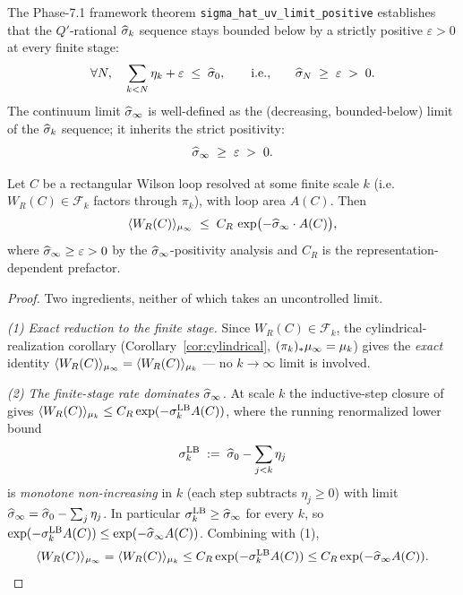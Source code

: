 The Phase-7.1 framework theorem
\texttt{sigma\_hat\_uv\_limit\_positive} establishes that the
$Q'$-rational $\widehat{\sigma}_k$ sequence stays bounded below by a strictly
positive $\varepsilon > 0$ at every finite stage:
\begin{equation*}
  \forall N, \quad \sum_{k < N} \eta_k + \varepsilon \;\le\; \widehat{\sigma}_0,
  \qquad \text{i.e.,} \qquad
  \widehat{\sigma}_N \;\ge\; \varepsilon \;>\; 0.
\end{equation*}
The continuum limit $\widehat{\sigma}_\infty$ is well-defined as the (decreasing,
bounded-below) limit of the $\widehat{\sigma}_k$ sequence; it inherits the
strict positivity:
\begin{equation*}
  \widehat{\sigma}_\infty \;\ge\; \varepsilon \;>\; 0.
\end{equation*}

\begin{proposition}
\label{prop:area-law-mu-infinity}
Let $C$ be a rectangular Wilson loop resolved at some finite scale
$k$ (i.e.\ $W_R(C) \in \mathcal{F}_k$ factors through $\pi_k$), with
loop area $A(C)$.  Then
\begin{equation*}
  \langle W_R(C) \rangle_{\mu_\infty}
  \;\le\;
  C_R \, \exp\bigl(-\widehat{\sigma}_\infty \cdot A(C)\bigr),
\end{equation*}
where $\widehat{\sigma}_\infty \ge \varepsilon > 0$ by the $\widehat{\sigma}_\infty$-positivity
analysis and $C_R$ is the representation-dependent prefactor.
\end{proposition}

\begin{proof}
Two ingredients, neither of which takes an uncontrolled limit.

\emph{(1) Exact reduction to the finite stage.}  Since $W_R(C) \in
\mathcal{F}_k$, the cylindrical-realization corollary
(Corollary~\ref{cor:cylindrical}, $(\pi_k)_* \mu_\infty = \mu_k$) gives the
\emph{exact} identity $\langle W_R(C)\rangle_{\mu_\infty} = \langle
W_R(C)\rangle_{\mu_k}$ --- no $k \to \infty$ limit is involved.

\emph{(2) The finite-stage rate dominates $\widehat{\sigma}_\infty$.}  At scale $k$
the inductive-step closure of  gives
$\langle W_R(C)\rangle_{\mu_k} \le C_R \exp(-\sigma^{\mathrm{LB}}_k
A(C))$, where the running renormalized lower bound
\begin{equation*}
  \sigma^{\mathrm{LB}}_k \;:=\; \widehat{\sigma}_0 - \sum_{j < k} \eta_j
\end{equation*}
is \emph{monotone non-increasing} in $k$ (each step subtracts
$\eta_j \ge 0$) with limit $\widehat{\sigma}_\infty = \widehat{\sigma}_0 - \sum_{j} \eta_j$.  In
particular $\sigma^{\mathrm{LB}}_k \ge \widehat{\sigma}_\infty$ for every $k$, so
$\exp(-\sigma^{\mathrm{LB}}_k A(C)) \le \exp(-\widehat{\sigma}_\infty A(C))$.
Combining with (1),
\begin{equation*}
  \langle W_R(C)\rangle_{\mu_\infty}
  = \langle W_R(C)\rangle_{\mu_k}
  \le C_R \exp(-\sigma^{\mathrm{LB}}_k A(C))
  \le C_R \exp(-\widehat{\sigma}_\infty A(C)). \qedhere
\end{equation*}
\end{proof}

